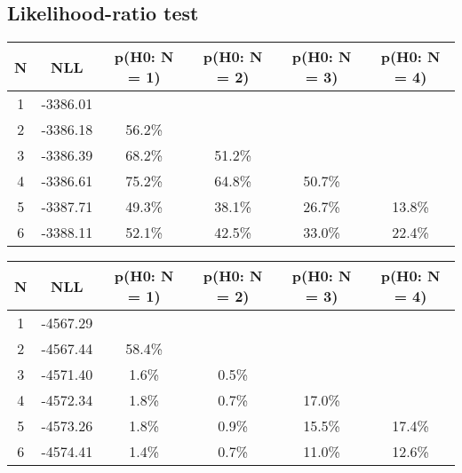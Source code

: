 \subsection{Likelihood-ratio test}
\begin{table}[htb]
	\begin{center}
{\footnotesize\renewcommand{\arraystretch}{1.4}
		\begin{tabular}{cc||cccc}
			N & NLL & p(H0: N = 1) & p(H0: N = 2) & p(H0: N = 3) & p(H0: N = 4)\\ 
		\hline
1 & -3386.01 & & & & \\
2 & -3386.18 & 56.2\% & & & \\
3 & -3386.39 & 68.2\% & 51.2\% & & \\
4 & -3386.61 & 75.2\% & 64.8\% & 50.7\% & \\
5 & -3387.71 & 49.3\% & 38.1\% & 26.7\% & 13.8\% \\
6 & -3388.11 & 52.1\% & 42.5\% & 33.0\% & 22.4\% \\
	\end{tabular}
		\label{tab:lab}
	}
	\end{center}\end{table}

\begin{table}[htb]
	\begin{center}
{\footnotesize\renewcommand{\arraystretch}{1.4}
		\begin{tabular}{cc||cccc}
			N & NLL & p(H0: N = 1) & p(H0: N = 2) & p(H0: N = 3) & p(H0: N = 4)\\ 
		\hline
1 & -4567.29 & & & & \\
2 & -4567.44 & 58.4\% & & & \\
3 & -4571.40 & 1.6\% & 0.5\% & & \\
4 & -4572.34 & 1.8\% & 0.7\% & 17.0\% & \\
5 & -4573.26 & 1.8\% & 0.9\% & 15.5\% & 17.4\% \\
6 & -4574.41 & 1.4\% & 0.7\% & 11.0\% & 12.6\% \\
	\end{tabular}
		\label{tab:lab}
	}
	\end{center}\end{table}

